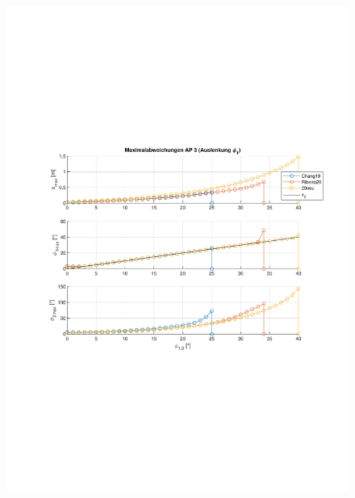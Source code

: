 \begin{figure}
\begin{minipage}[t]{0.45\linewidth}
		\includegraphics[scale=0.5]{Bilder/Parameter neu (Ribeiro) Creg off/AP3.pdf}
		\label{fig:ap3}
	 \end{minipage}
	\\
	\begin{minipage}[t]{0.45\linewidth}
		\centering

\end{minipage}
\end{figure}
